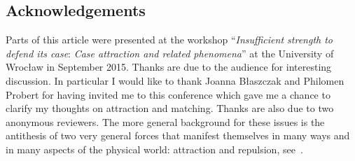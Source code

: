\documentclass[output=paper]{langsci/langscibook}
\begin{document}
\begin{refcontext}
\section*{Acknowledgements}
Parts of this article were presented at the workshop
    \enquote{\emph{Insufficient strength to defend its case}: \emph{Case
    attraction and related phenomena}} at the University of Wrocław in
    September 2015. Thanks are due to the audience for interesting discussion.
    In particular I would like to thank  Joanna Błaszczak and Philomen Probert
    for having invited me to this conference which gave me a chance to clarify
    my thoughts on attraction and matching. Thanks are also due to two
    anonymous reviewers.  The more general background for these issues is the
    antithesis of two very general forces that manifest themselves in many ways
    and in many aspects of the physical world: attraction and repulsion,
    see~\textcite{VanRiemsdijk2019}.

{\sloppy
\printbibliography[heading=subbibliography,notkeyword=this]
}

\end{refcontext}
\end{document}
